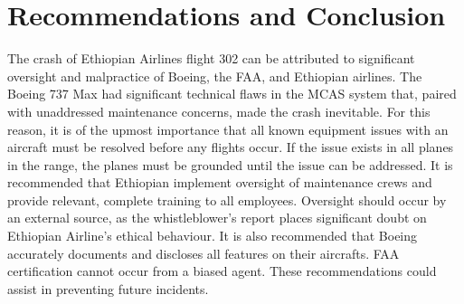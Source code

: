 \documentclass[
  10pt,
  promotesection,
  endnotes,
  draft,
]{memreport}
\begin{document}
  \section{Recommendations and Conclusion}
  The crash of Ethiopian Airlines flight 302 can be attributed to significant oversight and malpractice of Boeing, the FAA, and Ethiopian airlines. The Boeing 737 Max had significant technical flaws in the MCAS system that, paired with unaddressed maintenance concerns, made the crash inevitable. For this reason, it is of the upmost importance that all known equipment issues with an aircraft must be resolved before any flights occur. If the issue exists in all planes in the range, the planes must be grounded until the issue can be addressed. It is recommended that Ethiopian implement oversight of maintenance crews and provide relevant, complete training to all employees. Oversight should occur by an external source, as the whistleblower's report places significant doubt on Ethiopian Airline's ethical behaviour. It is also recommended that Boeing accurately documents and discloses all features on their aircrafts. FAA certification cannot occur from a biased agent. These recommendations could assist in preventing future incidents.

  \backmatter{}
\end{document}
